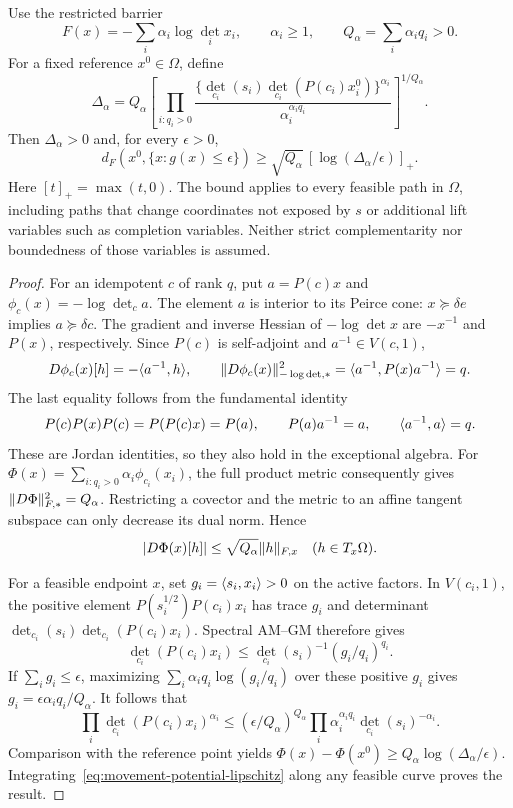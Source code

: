 \begin{theorem}\label{thm:movement-minor}
Use the restricted barrier
\[
 F(x)=-\sum_i\alpha_i\log\det_i x_i,\qquad \alpha_i\geq1,
 \qquad Q_\alpha=\sum_i\alpha_iq_i>0.
\]
For a fixed reference $x^0\in\Omega$, define
\begin{equation}\label{eq:movement-delta}
 \Delta_\alpha=Q_\alpha
 \left[\prod_{i:q_i>0}
 \frac{\{\det_{c_i}(s_i)\det_{c_i}(P(c_i)x_i^0)\}^{\alpha_i}}
      {\alpha_i^{\alpha_iq_i}}\right]^{1/Q_\alpha}.
\end{equation}
Then $\Delta_\alpha>0$ and, for every $\epsilon>0$,
\begin{equation}\label{eq:movement-minor-distance}
 d_F(x^0,\{x:g(x)\leq\epsilon\})
 \geq\sqrt{Q_\alpha}\,[\log(\Delta_\alpha/\epsilon)]_+.
\end{equation}
Here $[t]_+=\max(t,0)$. The bound applies to every feasible path in
$\Omega$, including paths that change coordinates not exposed by $s$
or additional lift variables such as completion variables. Neither
strict complementarity nor boundedness of those variables is assumed.
\end{theorem}
\begin{proof}
For an idempotent $c$ of rank $q$, put $a=P(c)x$ and
$\phi_c(x)=-\log\det_c a$. The element $a$ is interior to its Peirce
cone: $x\succeq\delta e$ implies $a\succeq\delta c$. The gradient and
inverse Hessian of $-\log\det x$ are $-x^{-1}$ and $P(x)$, respectively.
Since $P(c)$ is self-adjoint and $a^{-1}\in V(c,1)$,
\[
 D\phi_c(x)[h]=-\langle a^{-1},h\rangle,\qquad
 \lVert D\phi_c(x)\rVert_{-\log\det,*}^2
 =\langle a^{-1},P(x)a^{-1}\rangle=q.
\]
The last equality follows from the fundamental identity
\[
 P(c)P(x)P(c)=P(P(c)x)=P(a),\qquad
 P(a)a^{-1}=a,\qquad \langle a^{-1},a\rangle=q.
\]
These are Jordan identities, so they also hold in the exceptional algebra.
For $\Phi(x)=\sum_{i:q_i>0}\alpha_i\phi_{c_i}(x_i)$, the full product
metric consequently gives $\lVert D\Phi\rVert_{F,*}^2=Q_\alpha$.
Restricting a covector and the metric to an affine tangent subspace can
only decrease its dual norm. Hence
\begin{equation}\label{eq:movement-potential-lipschitz}
 |D\Phi(x)[h]|\leq\sqrt{Q_\alpha}\lVert h\rVert_{F,x}
 \quad(h\in T_x\Omega).
\end{equation}

For a feasible endpoint $x$, set $g_i=\langle s_i,x_i\rangle>0$ on the active
factors. In $V(c_i,1)$, the positive element
$P(s_i^{1/2})P(c_i)x_i$ has trace $g_i$ and determinant
$\det_{c_i}(s_i)\det_{c_i}(P(c_i)x_i)$. Spectral AM--GM therefore gives
\[
 \det_{c_i}(P(c_i)x_i)
 \leq\det_{c_i}(s_i)^{-1}(g_i/q_i)^{q_i}.
\]
If $\sum_i g_i\leq\epsilon$, maximizing
$\sum_i\alpha_iq_i\log(g_i/q_i)$ over these positive $g_i$ gives
$g_i=\epsilon\alpha_iq_i/Q_\alpha$. It follows that
\[
 \prod_i\det_{c_i}(P(c_i)x_i)^{\alpha_i}
 \leq (\epsilon/Q_\alpha)^{Q_\alpha}
 \prod_i\alpha_i^{\alpha_iq_i}\det_{c_i}(s_i)^{-\alpha_i}.
\]
Comparison with the reference point yields
$\Phi(x)-\Phi(x^0)\geq Q_\alpha\log(\Delta_\alpha/\epsilon)$.
Integrating~\eqref{eq:movement-potential-lipschitz} along any feasible
curve proves the result.
\end{proof}

